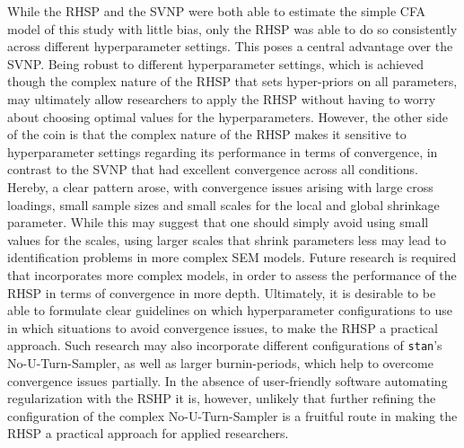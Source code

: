 \documentclass[
  man, donotrepeattitle,floatsintext]{apa6}
\begin{document}
While the RHSP and the SVNP were both able to estimate the simple CFA
model of this study with little bias, only the RHSP was able to do so
consistently across different hyperparameter settings. This poses a
central advantage over the SVNP. Being robust to different
hyperparameter settings, which is achieved though the complex nature of
the RHSP that sets hyper-priors on all parameters, may ultimately allow
researchers to apply the RHSP without having to worry about choosing
optimal values for the hyperparameters. However, the other side of the
coin is that the complex nature of the RHSP makes it sensitive to
hyperparameter settings regarding its performance in terms of
convergence, in contrast to the SVNP that had excellent convergence
across all conditions. Hereby, a clear pattern arose, with convergence
issues arising with large cross loadings, small sample sizes and small
scales for the local and global shrinkage parameter. While this may
suggest that one should simply avoid using small values for the scales,
using larger scales that shrink parameters less may lead to
identification problems in more complex SEM models. Future research is
required that incorporates more complex models, in order to assess the
performance of the RHSP in terms of convergence in more depth.
Ultimately, it is desirable to be able to formulate clear guidelines on
which hyperparameter configurations to use in which situations to avoid
convergence issues, to make the RHSP a practical approach. Such research
may also incorporate different configurations of \texttt{stan}'s
No-U-Turn-Sampler, as well as larger burnin-periods, which help to
overcome convergence issues partially. In the absence of user-friendly
software automating regularization with the RSHP it is, however,
unlikely that further refining the configuration of the complex
No-U-Turn-Sampler is a fruitful route in making the RHSP a practical
approach for applied researchers.
\end{document}
